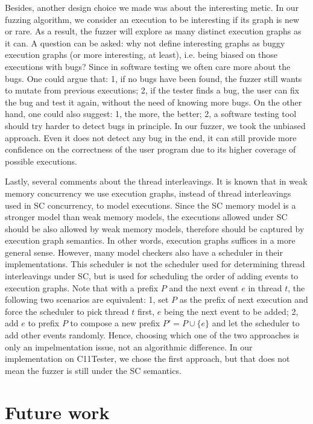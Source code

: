 Besides, another design choice we made was about the interesting metic. In our fuzzing algorithm, we consider an execution to be interesting if its graph is new or rare. As a result, the fuzzer will explore as many distinct execution graphs as it can. A question can be asked: why not define interesting graphs as buggy execution graphs (or more interesting, at least), i.e. being biased on those executions with bugs? Since in software testing we often care more about the bugs. One could argue that: 1, if no bugs have been found, the fuzzer still wants to mutate from previous executions; 2, if the tester finds a bug, the user can fix the bug and test it again, without the need of knowing more bugs. On the other hand, one could also suggest: 1, the more, the better; 2, a software testing tool should try harder to detect bugs in principle. In our fuzzer, we took the unbiased approach. Even it does not detect any bug in the end, it can still provide more confidence on the correctness of the user program due to its higher coverage of possible executions.

Lastly, several comments about the thread interleavings. It is known that in weak memory concurrency we use execution graphs, instead of thread interleavings used in SC concurrency, to model executions. Since the SC memory model is a stronger model than weak memory models, the executions allowed under SC should be also allowed by weak memory models, therefore should be captured by execution graph semantics. In other words, execution graphs suffices in a more general sense. However, many model checkers also have a scheduler in their implementations. This scheduler is not the scheduler used for determining thread interleavings under SC, but is used for scheduling the order of adding events to execution graphs. Note that with a prefix $P$ and the next event $e$ in thread $t$, the following two scenarios are equivalent: 1, set $P$ as the prefix of next execution and force the scheduler to pick thread $t$ first, $e$ being the next event to be added; 2, add $e$ to prefix $P$ to compose a new prefix $P' = P \cup \{e\}$ and let the scheduler to add other events randomly. Hence, choosing which one of the two approaches is only an impelmentation issue, not an algorithmic difference. In our implementation on C11Tester, we chose the first approach, but that does not mean the fuzzer is still under the SC semantics.


\section{Future work}



